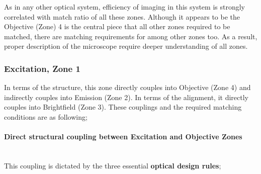 As in any other optical system, efficiency of imaging in this system is strongly correlated with
match ratio of all these zones. Although it appears to be the Objective (Zone) 4 is the central
piece that all other zones required to be matched, there are matching requirements for among other
zones too. As a result, proper description of the microscope require deeper understanding of all
zones.

\subsubsection{Excitation, Zone 1}
In terms of the structure, this zone directly couples into Objective (Zone 4) and indirectly couples 
into Emission (Zone 2). In terms of the alignment, it directly couples into Brightfield (Zone 3).
These couplings and the required matching conditions are as following;

\paragraph{Direct structural coupling between Excitation and Objective Zones}\mbox{}\\
This coupling is dictated by the three essential \textbf{optical design rules};

